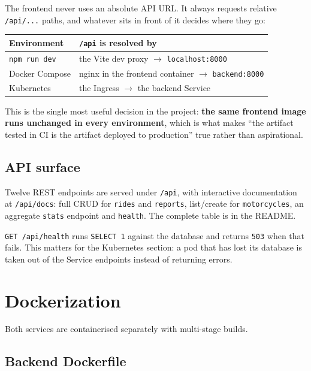 \documentclass[10pt,a4paper]{article}
\newcommand{\cd}[1]{\texttt{\small #1}}
\begin{document}
The frontend never uses an absolute API URL. It always requests relative
\cd{/api/...} paths, and whatever sits in front of it decides where they go:

\begin{center}
\begin{tabular}{@{}ll@{}}
\toprule
\textbf{Environment} & \textbf{\cd{/api} is resolved by} \\
\midrule
\cd{npm run dev} & the Vite dev proxy $\rightarrow$ \cd{localhost:8000} \\
Docker Compose   & nginx in the frontend container $\rightarrow$ \cd{backend:8000} \\
Kubernetes       & the Ingress $\rightarrow$ the backend Service \\
\bottomrule
\end{tabular}
\end{center}

This is the single most useful decision in the project: \textbf{the same
frontend image runs unchanged in every environment}, which is what makes ``the
artifact tested in CI is the artifact deployed to production'' true rather
than aspirational.

\subsection{API surface}

Twelve REST endpoints are served under \cd{/api}, with interactive
documentation at \cd{/api/docs}: full CRUD for \cd{rides} and \cd{reports},
list/create for \cd{motorcycles}, an aggregate \cd{stats} endpoint and
\cd{health}. The complete table is in the README.

\cd{GET /api/health} runs \cd{SELECT 1} against the database and returns
\cd{503} when that fails. This matters for the Kubernetes section: a pod that
has lost its database is taken out of the Service endpoints instead of
returning errors.

\section{Dockerization}

Both services are containerised separately with multi-stage builds.

\subsection{Backend Dockerfile}
\end{document}
